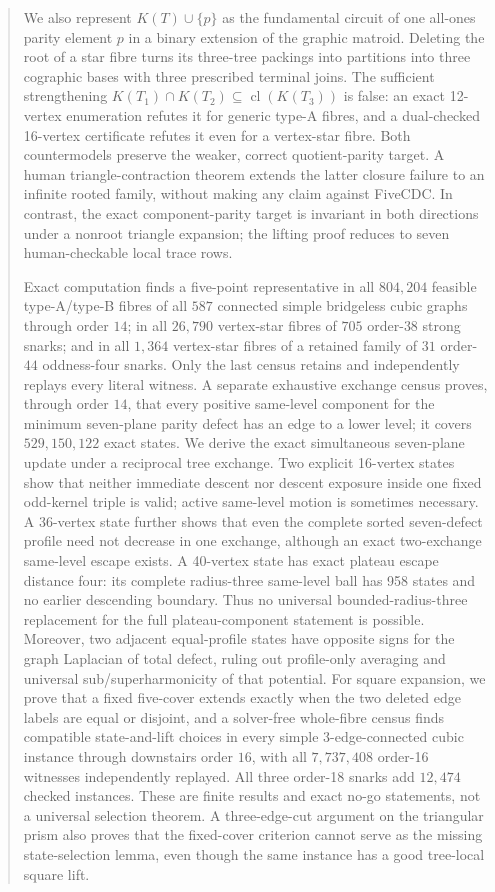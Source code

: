 \documentclass[11pt]{article}
\theoremstyle{definition}
\theoremstyle{remark}
\newcommand{\1}{\mathbf 1}
\begin{document}
\begin{abstract}
We also represent \(K(T)\cup\{p\}\) as the fundamental circuit of one
all-ones parity element \(p\) in a binary extension of the graphic matroid.
Deleting the root of a star fibre turns its three-tree packings into
partitions into three cographic bases with three prescribed terminal joins.
The sufficient strengthening
\(K(T_1)\cap K(T_2)\subseteq\operatorname{cl}(K(T_3))\) is false: an exact
12-vertex enumeration refutes it for generic type-A fibres, and a
dual-checked 16-vertex certificate refutes it even for a vertex-star fibre.
Both countermodels preserve the weaker, correct quotient-parity target.
A human triangle-contraction theorem extends the latter closure failure to
an infinite rooted family, without making any claim against FiveCDC.  In
contrast, the exact component-parity target is invariant in both directions
under a nonroot triangle expansion; the lifting proof reduces to seven
human-checkable local trace rows.

Exact computation finds a five-point representative in all \(804{,}204\)
feasible type-A/type-B fibres of all \(587\) connected simple bridgeless
cubic graphs through order \(14\); in all \(26{,}790\) vertex-star fibres
of \(705\) order-\(38\) strong snarks; and in all \(1{,}364\) vertex-star
fibres of a retained family of \(31\) order-\(44\) oddness-four snarks.
Only the last census retains and independently replays every literal
witness.  A separate exhaustive exchange census proves, through order
\(14\), that every positive same-level component for the minimum
seven-plane parity defect has an edge to a lower level; it covers
\(529{,}150{,}122\) exact states.  We derive the exact simultaneous
seven-plane update under a reciprocal tree exchange.  Two explicit
16-vertex states show that neither immediate descent nor descent exposure
inside one fixed odd-kernel triple is valid; active same-level motion is
sometimes necessary.  A 36-vertex state further shows that even the complete
sorted seven-defect profile need not decrease in one exchange, although an
exact two-exchange same-level escape exists.  A 40-vertex state has exact
plateau escape distance four: its complete radius-three same-level ball has
958 states and no earlier descending boundary.  Thus no universal
bounded-radius-three replacement for the full plateau-component statement is
possible.  Moreover, two adjacent equal-profile states have opposite signs
for the graph Laplacian of total defect, ruling out profile-only averaging
and universal sub/superharmonicity of that potential.  For square expansion,
we prove
that a fixed five-cover extends exactly when the two deleted edge labels are
equal or disjoint, and a solver-free whole-fibre census finds compatible
state-and-lift choices in every simple 3-edge-connected cubic instance
through downstairs order \(16\), with all \(7{,}737{,}408\) order-16
witnesses independently replayed.  All three order-18 snarks add
\(12{,}474\) checked instances.  These are finite results and exact no-go
statements, not a universal selection theorem.  A three-edge-cut argument
on the triangular prism also proves that the fixed-cover criterion cannot
serve as the missing state-selection lemma, even though the same instance
has a good tree-local square lift.
\end{abstract}
\end{document}
